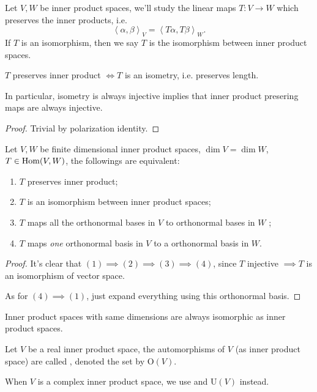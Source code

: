 Let $V, W$ be inner product spaces, we'll study the linear maps $T: V\to W$
which preserves the inner products, i.e.
\[
	\left<\alpha,\beta \right>_V = \left<T\alpha, T\beta \right>_W.
\]
If $T$ is an isomorphism, then we say $T$ is the isomorphism between
inner product spaces.
\begin{proposition}
	$T$ preserves inner product $\iff T$ is an isometry, i.e. preserves length.

	In particular, isometry is always injective implies that
	inner product presering maps are always injective.
\end{proposition}
\begin{proof}[Proof]
    Trivial by polarization identity.
\end{proof}
\begin{proposition}
	Let $V,W$ be finite dimensional inner product spaces, $\dim V = \dim W$,
	$T \in \operatorname{Hom}(V, W)$, the followings are equivalent:
	\begin{enumerate}[\indent(1)]
		\item $T$ preserves inner product;
		\item  $T$ is an isomorphism between inner product spaces;
		\item $T$ maps all the orthonormal bases in $V$ to
			orthonormal bases in $W$ ;
		\item $T$ maps \textit{one} orthonormal basis in $V$ to a
			orthonormal basis in $W$.
	\end{enumerate}
\end{proposition}
\begin{proof}[Proof]
    It's clear that $(1)\implies (2)\implies (3)\implies (4)$,
	since $T$ injective $ \implies T$ is an isomorphism of vector space.

	As for $(4)\implies (1)$, just expand everything using this orthonormal basis.
\end{proof}
\begin{corollary}
    Inner product spaces with same dimensions are always isomorphic
	as inner product spaces.
\end{corollary}

\begin{definition}
	Let $V$ be a real inner product space, the automorphisms of $V$
	(as inner product space) are
	called , denoted the set by $\mathrm{O}(V)$.

	When $V$ is a complex inner product space,
	we use  and $\mathrm{U}(V)$ instead.
\end{definition}

